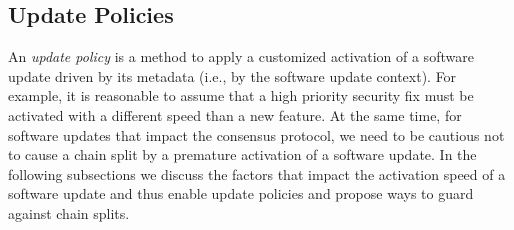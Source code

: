 

\subsection{Update Policies} 
An \emph{update policy} is a method to apply a customized activation of a software update driven by its metadata (i.e., by the software update context). For example, it is reasonable to assume that a high priority security fix must be activated with a different speed than a  new feature. At the same time, for software updates that impact the consensus protocol, we need to be cautious not to cause a chain split by a premature activation of a software update.
In the following subsections we discuss the factors that impact the activation speed of a software update and thus enable update policies and propose ways to guard against chain splits.
 

